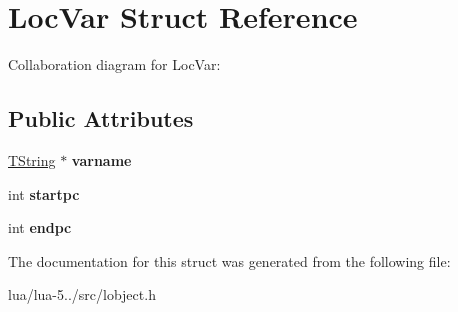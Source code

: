 \hypertarget{struct_loc_var}{\section{Loc\+Var Struct Reference}
\label{struct_loc_var}
}


Collaboration diagram for Loc\+Var\+:
\subsection*{Public Attributes}
\begin{DoxyCompactItemize}
\item 
\hypertarget{struct_loc_var_acf62684d78349320b90b4acfa3b6d22a}{\hyperlink{union_t_string}{T\+String} $\ast$ {\bfseries varname}}\label{struct_loc_var_acf62684d78349320b90b4acfa3b6d22a}

\item 
\hypertarget{struct_loc_var_ac5a8bf5a59430eea070db5b1a97d8b88}{int {\bfseries startpc}}\label{struct_loc_var_ac5a8bf5a59430eea070db5b1a97d8b88}

\item 
\hypertarget{struct_loc_var_af7f0f7d509579ffec5610e329f85693b}{int {\bfseries endpc}}\label{struct_loc_var_af7f0f7d509579ffec5610e329f85693b}

\end{DoxyCompactItemize}


The documentation for this struct was generated from the following file\+:\begin{DoxyCompactItemize}
\item 
lua/lua-\/5../src/lobject.\+h\end{DoxyCompactItemize}
